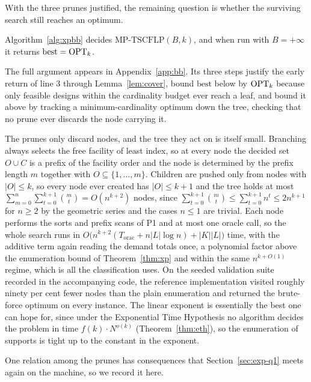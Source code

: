 With the three prunes justified, the remaining question is whether the
surviving search still reaches an optimum.

\begin{proposition}[correctness]\label{prop:bbcorrect}
Algorithm~\ref{alg:xpbb} decides $\mathrm{MP\text{-}TSCFLP}(B,k)$, and when
run with $B=+\infty$ it returns $\mathrm{best}=\mathrm{OPT}_k$.
\end{proposition}
The full argument appears in Appendix~\ref{app:bb}. Its three steps justify
the early return of line 3 through Lemma~\ref{lem:cover}, bound
$\mathrm{best}$ below by $\mathrm{OPT}_k$ because only feasible designs within
the cardinality budget ever reach a leaf, and bound it above by tracking
a minimum-cardinality optimum down the tree, checking that no prune ever
discards the node carrying it.

The prunes only discard nodes, and the tree they act on is itself
small. Branching always selects the free facility of least index, so at
every node the decided set $O\cup C$ is a prefix of the facility order
and the node is determined by the prefix length $m$ together with
$O\subseteq\{1,\dots,m\}$. Children are pushed only from nodes with
$|O|\le k$, so every node ever created has $|O|\le k+1$ and the tree
holds at most
$\sum_{m=0}^{n}\sum_{t=0}^{k+1}\binom{m}{t}=O(n^{k+2})$ nodes, since
$\sum_{t=0}^{k+1}\binom{m}{t}\le\sum_{t=0}^{k+1}n^{t}\le 2n^{k+1}$
for $n\ge 2$ by the geometric series and the cases $n\le 1$ are
trivial. Each
node performs the sorts and prefix scans of P1 and at most one oracle
call, so the whole search runs in
$O\bigl(n^{k+2}(T_{\mathrm{orac}}+n|L|\log n)+|K||L|\bigr)$ time, with
the additive term again reading the demand totals once, a
polynomial factor above the enumeration bound of Theorem~\ref{thm:xp}
and within the same $n^{k+O(1)}$ regime, which is all the
classification uses. On the seeded validation suite
recorded in the accompanying code, the reference implementation visited
roughly ninety per cent fewer nodes than the plain enumeration and returned
the brute-force optimum on every instance. The
linear exponent is essentially the best one can hope for, since under the
Exponential Time Hypothesis no algorithm decides the problem in time
$f(k)\cdot N^{o(k)}$ (Theorem~\ref{thm:eth}), so the enumeration of
supports is tight up to the constant in the exponent.

One relation among the prunes has consequences that
Section~\ref{sec:exp-q1} meets again on the machine, so we record it
here.

